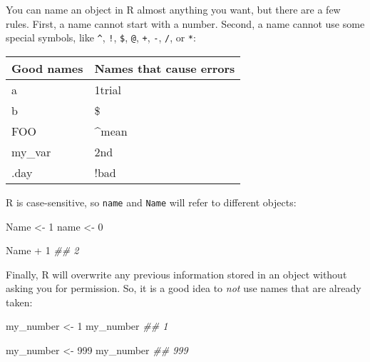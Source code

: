 \documentclass[
  letterpaper,
  DIV=11,
  numbers=noendperiod]{scrbook}
\newenvironment{Shaded}{\begin{snugshade}}{\end{snugshade}}
\newcommand{\DecValTok}[1]{\textcolor[rgb]{0.68,0.00,0.00}{#1}}
\newcommand{\DocumentationTok}[1]{\textcolor[rgb]{0.37,0.37,0.37}{\textit{#1}}}
\newcommand{\NormalTok}[1]{\textcolor[rgb]{0.00,0.23,0.31}{#1}}
\newcommand{\OtherTok}[1]{\textcolor[rgb]{0.00,0.23,0.31}{#1}}
\newcommand{\SpecialCharTok}[1]{\textcolor[rgb]{0.37,0.37,0.37}{#1}}
\begin{document}
You can name an object in R almost anything you want, but there are a
few rules. First, a name cannot start with a number. Second, a name
cannot use some special symbols, like \texttt{\^{}}, \texttt{!},
\texttt{\$}, \texttt{@}, \texttt{+}, \texttt{-}, \texttt{/}, or
\texttt{*}:

\begin{longtable}[]{@{}ll@{}}
\toprule\noalign{}
Good names & Names that cause errors \\
\midrule\noalign{}
\endhead
\bottomrule\noalign{}
\endlastfoot
a & 1trial \\
b & \$ \\
FOO & \^{}mean \\
my\_var & 2nd \\
.day & !bad \\
\end{longtable}

\begin{tcolorbox}[enhanced jigsaw, breakable, colback=white, colbacktitle=quarto-callout-warning-color!10!white, arc=.35mm, bottomrule=.15mm, coltitle=black, left=2mm, rightrule=.15mm, colframe=quarto-callout-warning-color-frame, leftrule=.75mm, opacitybacktitle=0.6, bottomtitle=1mm, toptitle=1mm, titlerule=0mm, opacityback=0, title=\textcolor{quarto-callout-warning-color}{\faExclamationTriangle}\hspace{0.5em}{Capitalization}, toprule=.15mm]

R is case-sensitive, so \texttt{name} and \texttt{Name} will refer to
different objects:

\begin{Shaded}
\begin{Highlighting}[]
\NormalTok{Name }\OtherTok{\textless{}{-}} \DecValTok{1}
\NormalTok{name }\OtherTok{\textless{}{-}} \DecValTok{0}  
  
\NormalTok{Name }\SpecialCharTok{+} \DecValTok{1}  
\DocumentationTok{\#\# 2  }
\end{Highlighting}
\end{Shaded}

\end{tcolorbox}

Finally, R will overwrite any previous information stored in an object
without asking you for permission. So, it is a good idea to \emph{not}
use names that are already taken:

\begin{Shaded}
\begin{Highlighting}[]
\NormalTok{my\_number }\OtherTok{\textless{}{-}} \DecValTok{1}
\NormalTok{my\_number }
\DocumentationTok{\#\# 1}

\NormalTok{my\_number }\OtherTok{\textless{}{-}} \DecValTok{999}
\NormalTok{my\_number}
\DocumentationTok{\#\# 999}
\end{Highlighting}
\end{Shaded}
\end{document}
